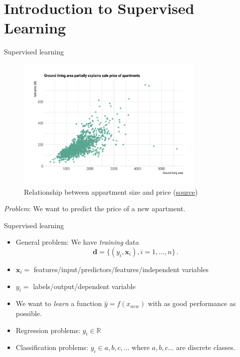 \documentclass[10pt]{beamer}
\begin{document}
\section{Introduction to Supervised Learning}
\frame{\sectionpage}

\begin{frame}{Supervised learning}

\begin{figure}[h]
\caption{Relationship between appartment size and price (\href{https://www.data-to-viz.com/story/TwoNum.html}{source})}
\centering
\includegraphics[width=0.8\textwidth]{figs/scatter_apartment.png}
\end{figure}

\emph{Problem}: We want to predict the price of a new apartment.

\end{frame}



\begin{frame}{Supervised learning}

\begin{itemize}
\item General problem: We have \emph{training} data
\[
\mathbf{d} = \{(y_i, \mathbf{x}_i), i = 1, ..., n\} \,.
\]
\item $\mathbf{x}_i = $ features/input/predictors/features/independent variables
\item $y_i = $ labels/output/dependent variable
\item We want to \emph{learn} a function $\hat{y} = f(x_{new})$ with as good performance as possible.\pause
\item Regression problems: $y_i \in \mathbb{R}$
\item Classification problems: $y_i \in {a,b,c,...}$ where $a,b,c ...$ are discrete classes.
\end{itemize}

\end{frame}
\end{document}
